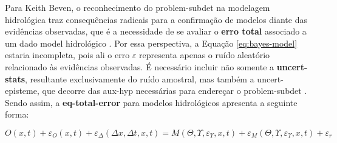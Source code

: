 \documentclass[./main.tex]{subfiles}
\begin{document}
\par Para Keith Beven, o reconhecimento do \gls{problem-subdet} na modelagem hidrológica traz consequências radicais para a confirmação de modelos diante das evidências observadas, que é a necessidade de se avaliar o \textbf{erro total} associado a um dado \gls{model} hidrológico \cite{Beven2005}. Por essa perspectiva, a Equação \eqref{eq:bayes-model} estaria incompleta, pois ali o erro $\varepsilon$ representa apenas o ruído aleatório relacionado às evidências observadas. É necessário incluir não somente a \textbf{\gls{uncert-stats}}, resultante exclusivamente do ruído amostral, mas também a \gls{uncert-episteme}, que decorre das \gls{aux-hyp} necessárias para endereçar o \gls{problem-subdet} \cite{Beven2016}. Sendo assim, a \textbf{\gls{eq-total-error}} para modelos hidrológicos apresenta a seguinte forma:
\begin{linenomath*}
\begin{equation}
\label{eq:total-error}
    O(x, t) + \varepsilon_{O}(x, t) + \varepsilon_{\Delta}(\Delta x,\Delta t, x, t) = M(\Theta, \Upsilon, \varepsilon_{\Upsilon}, x, t) + \varepsilon_{M}(\Theta, \Upsilon, \varepsilon_{\Upsilon}, x, t) + \varepsilon_r
\end{equation}
\end{linenomath*}
\end{document}
